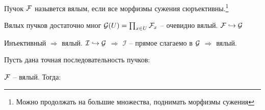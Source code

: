 \documentclass[../main.tex]{subfiles}
\begin{document}
\begin{to_def}
Пучок $\mathcal{F}$ назывется вялым, если все морфизмы сужения сюръективны.\footnote{Можно продолжать на большие множества, поднимать морфизмы сужения}
\end{to_def}
\begin{to_claim}
Вялых пучков достаточно мног $\mathcal{G}(U) = \prod_{x \in U} \mathcal{F}_x$ -- очевидно вялый. $\mathcal{F} \hookrightarrow \mathcal{G}$
\end{to_claim}
\begin{to_claim}
Инъективный $\Rightarrow$ вялый. $\mathcal{I} \hookrightarrow \mathcal{G}$ $\Rightarrow$ $\mathcal{I}$ -- прямое слагаемо в $\mathcal{G}$ $\Rightarrow$ вялый.
\end{to_claim}
\begin{to_claim}
Пусть дана точная последовательность пучков:
\bee
{}
\eee
$\mathcal{F}$ -- вялый. Тогда:
\bee
{}
\eee
\end{to_claim}
\end{document}
